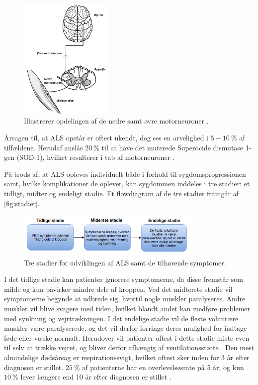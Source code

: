\begin{figure}[H]
\centering
\includegraphics[width=0.4\textwidth]{figures/motorneuroner.png}
\caption{Illustrerer opdelingen af de nedre samt øvre motorneuroner \citep{miller2005}.}
\label{fig:motorneuroner}
\end{figure}

\noindent
Årsagen til, at ALS opstår er oftest ukendt, dog ses en arvelighed i $5 - 10~\%$ af tilfældene. Herudaf anslås $20~\%$ til at have det muterede Superocide dismutase 1-gen (SOD-1), hvilket resulterer i tab af motorneuroner \citep{miller2005}.

På trods af, at ALS opleves individuelt både i forhold til sygdomsprogressionen samt, hvilke komplikationer de oplever, kan sygdommen inddeles i tre stadier: et tidligt, midter og endeligt stadie. Et flowdiagram af de tre stadier framgår af \autoref{fig:stadier}.

\begin{figure}[H]
\centering
\includegraphics[width=0.8\textwidth]{figures/stadier.png}
\caption{Tre stadier for udviklingen af ALS samt de tilhørende symptomer.}
\label{fig:stadier}
\end{figure}

\noindent
I det tidlige stadie kan patienter ignorere symptomerne, da disse fremstår som milde og kun påvirker mindre dele af kroppen. 
Ved det midterste stadie vil symptomerne begynde at udbrede sig, hvortil nogle muskler paralyseres. Andre muskler vil blive svagere med tiden, hvilket blandt andet kan medføre problemer med synkning og vejrtrækningen. I det endelige stadie vil de fleste voluntære muskler være paralyserede, og det vil derfor forringe deres mulighed for indtage føde eller væske normalt. Herudover vil patienter oftest i dette stadie miste even til selv at trække vejret, og bliver derfor afhængig af ventilationsstøtte \citep{themusculardystrophyassociation2016}.
Den mest almindelige dødsårsag er respirationssvigt, hvilket oftest sker inden for 3 år efter diagnosen er stillet. $25~\%$ af patienterne har en overlevelsesrate på 5 år, og kun $10~\%$ lever længere end 10 år efter diagnosen er stillet \citep{grehl2011, miller2005}.





